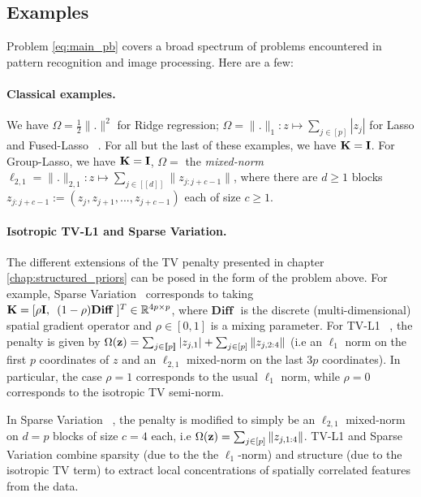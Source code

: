 \subsection{Examples}
Problem \eqref{eq:main_pb} covers a broad spectrum of problems
encountered in pattern recognition and image processing. Here are a few:

\paragraph*{Classical examples.}
We have $\Omega = \frac{1}{2}\|.\|^2$ for Ridge regression;
$\Omega = \|.\|_1: z \mapsto \sum_{j \in [p]}|z_j|$
for Lasso and Fused-Lasso ~\citep{Tibshirani05}. For all but the last of
these examples, we have $\mathbf{K} = \mathbf{I}$. For Group-Lasso, we have $\mathbf{K}=\mathbf{I}$,
$\Omega = $ the \textit{mixed-norm} $\ell_{2,1}= \|.\|_{2,1}:z
\mapsto \sum_{j \in [\![d]\!]}\|z_{j:j+c-1}\|$, where there are $d \ge
1$ blocks $z_{j:j+c-1}:=(z_j, z_{j+1}, ..., z_{j+c-1})$ each of size $c \ge
1$. %
\label{sec:examples}

\paragraph*{Isotropic TV-L1 and Sparse Variation.}
The different extensions of the TV penalty presented in chapter \ref{chap:structured_priors} can be posed in the form of the problem above.
For example, Sparse Variation~\citep{eickenberg2015total} corresponds to taking
$\mathbf{K} = [\rho\mathbf{I},\hspace{.5em}(1-\rho)\textbf{Diff }]^T \in
\mathbb{R}^{4p \times p}$, where $\textbf{Diff }$ is the discrete
(multi-dimensional) spatial gradient operator
and $\rho \in [0, 1]$ is a mixing parameter.
For TV-L1 ~\citep{baldassarre2012,gramfort2013}, the penalty is
given by $\Omega(\mathbf{z}) = \sum_{j \in [\![p]\!]}|z_{j,1}| + \sum_{j \in
  [p]}\|z_{j,2:4}\|$ (i.e an $\ell_1$ norm on the first $p$
coordinates of $z$ and an $\ell_{2,1}$ mixed-norm on the last $3p$
coordinates). In particular, the case $\rho = 1$
corresponds to the usual $\ell_1$ norm, while $\rho = 0$ corresponds to
the isotropic TV semi-norm.

In Sparse Variation ~\citep{eickenberg2015total}, 
the penalty is modified to simply be an $\ell_{2,1}$
mixed-norm on $d = p$ blocks of size $c = 4$ each, i.e
$\Omega(\mathbf{z}) = \sum_{j \in [p]}\|z_{j,1:4}\|$. 
TV-L1 and Sparse Variation combine sparsity (due to the
the $\ell_1$-norm) and structure (due to the isotropic TV term) to
extract local concentrations of spatially correlated features
from the data.%

